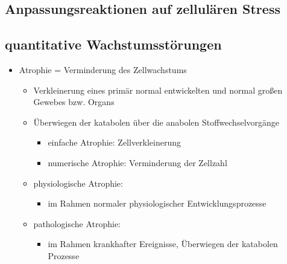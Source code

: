 \subsection{Anpassungsreaktionen auf zellulären Stress}

\subsection{quantitative Wachstumsstörungen}
	\begin{itemize}
		\item Atrophie = Verminderung des Zellwachstums
			\begin{itemize}
				\item Verkleinerung eines primär normal entwickelten und normal großen Gewebes bzw. Organs
				\item Überwiegen der katabolen über die anabolen Stoffwechselvorgänge
					\begin{itemize}
						\item einfache Atrophie: Zellverkleinerung
						\item numerische Atrophie: Verminderung der Zellzahl
					\end{itemize}
				\item physiologische Atrophie:
					\begin{itemize}
						\item im Rahmen normaler physiologischer Entwicklungsprozesse
					\end{itemize}
				\item pathologische Atrophie:
					\begin{itemize}
						\item im Rahmen krankhafter Ereignisse, Überwiegen der katabolen Prozesse
					\end{itemize}
			\end{itemize}
	\end{itemize}

